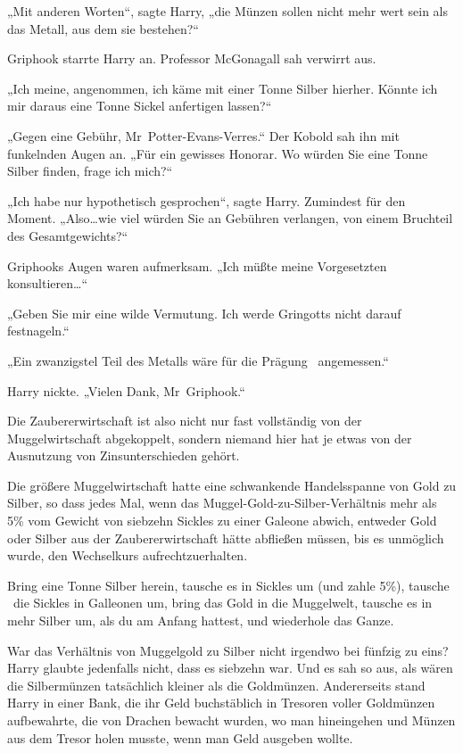 {„Mit anderen Worten“, sagte Harry, „die Münzen sollen nicht mehr wert sein als das Metall, aus dem sie bestehen?“

Griphook starrte Harry an. Professor McGonagall sah verwirrt aus.

„Ich meine, angenommen, ich käme mit einer Tonne Silber hierher. Könnte ich mir daraus eine Tonne Sickel anfertigen lassen?“

„Gegen eine Gebühr, Mr~Potter-Evans-Verres.“ Der Kobold sah ihn mit funkelnden Augen an. „Für ein gewisses Honorar. Wo würden Sie eine Tonne Silber finden, frage ich mich?“

„Ich habe nur hypothetisch gesprochen“, sagte Harry. Zumindest für den Moment. „Also…wie viel würden Sie an Gebühren verlangen, von einem Bruchteil des Gesamtgewichts?“

Griphooks Augen waren aufmerksam. „Ich müßte meine Vorgesetzten konsultieren…“

„Geben Sie mir eine wilde Vermutung. Ich werde Gringotts nicht darauf festnageln.“

„Ein zwanzigstel Teil des Metalls wäre für die Prägung ~angemessen.“

Harry nickte. „Vielen Dank, Mr~Griphook.“

Die Zaubererwirtschaft ist also nicht nur fast vollständig von der Muggelwirtschaft abgekoppelt, sondern niemand hier hat je etwas von der Ausnutzung von Zinsunterschieden gehört.

Die größere Muggelwirtschaft hatte eine schwankende Handelsspanne von Gold zu Silber, so dass jedes Mal, wenn das Muggel-Gold-zu-Silber-Verhältnis mehr als 5\% vom Gewicht von siebzehn Sickles zu einer Galeone abwich, entweder Gold oder Silber aus der Zaubererwirtschaft hätte abfließen müssen, bis es unmöglich wurde, den Wechselkurs aufrechtzuerhalten.

Bring eine Tonne Silber herein, tausche es in Sickles um (und zahle 5\%), tausche ~die Sickles in Galleonen um, bring das Gold in die Muggelwelt, tausche es in mehr Silber um, als du am Anfang hattest, und wiederhole das Ganze.

War das Verhältnis von Muggelgold zu Silber nicht irgendwo bei fünfzig zu eins? Harry glaubte jedenfalls nicht, dass es siebzehn war. Und es sah so aus, als wären die Silbermünzen tatsächlich kleiner als die Goldmünzen. Andererseits stand Harry in einer Bank, die ihr Geld buchstäblich in Tresoren voller Goldmünzen aufbewahrte, die von Drachen bewacht wurden, wo man hineingehen und Münzen aus dem Tresor holen musste, wenn man Geld ausgeben wollte.

}
